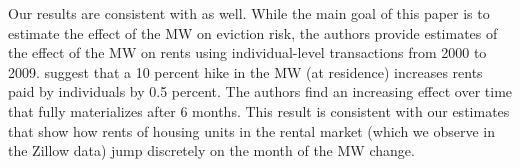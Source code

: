 Our results are consistent with \textcite{AgarwalEtAl2021} as well.
While the main goal of this paper is to estimate the effect of the MW on eviction
risk, the authors provide estimates of the effect of the MW on rents using
individual-level transactions from 2000 to 2009.
\textcite[][, Figure 4]{AgarwalEtAl2021} suggest that a 10 percent hike 
in the MW (at residence) increases rents paid by individuals by 0.5 percent.
The authors find an increasing effect over time that fully materializes after 
6 months.
This result is consistent with our estimates that show how rents of housing 
units in the rental market (which we observe in the Zillow data) jump 
discretely on the month of the MW change.
